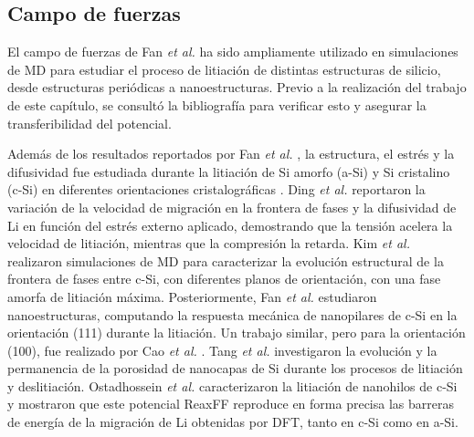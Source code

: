 \subsection{Campo de fuerzas}

El campo de fuerzas de Fan \textit{et al.} ha sido ampliamente utilizado en 
simulaciones de MD para estudiar el proceso de litiación de distintas estructuras
de silicio, desde estructuras periódicas a nanoestructuras. Previo a la 
realización del trabajo de este capítulo, se consultó la bibliografía para 
verificar esto y asegurar la transferibilidad del potencial. 

Además de los resultados reportados por Fan \textit{et al.} \cite{fan2013}, 
la estructura, el estrés y la difusividad fue estudiada durante la litiación de 
Si amorfo (a-Si) y Si cristalino (c-Si) en diferentes orientaciones 
cristalográficas \cite{chen2020, kim2015}. Ding \textit{et al.} \cite{ding2017} 
reportaron la variación de la velocidad de migración en la frontera de fases y la 
difusividad de Li en función del estrés externo aplicado, demostrando que la 
tensión acelera la velocidad de litiación, mientras que la compresión la retarda. 
Kim \textit{et al.} \cite{kim2014} realizaron simulaciones de MD para caracterizar 
la evolución estructural de la frontera de fases entre c-Si, con diferentes planos 
de orientación, con una fase amorfa de litiación máxima. Posteriormente, Fan 
\textit{et al.} \cite{fan2018} estudiaron nanoestructuras, computando la respuesta
mecánica de nanopilares de c-Si en la orientación (111) durante la litiación.
Un trabajo similar, pero para la orientación (100), fue realizado por Cao 
\textit{et al.} \cite{cao2019}. Tang \textit{et al.} \cite{tang2019} investigaron
la evolución y la permanencia de la porosidad de nanocapas de Si durante los 
procesos de litiación y deslitiación. Ostadhossein \textit{et al.} 
\cite{ostadhossein2015} caracterizaron la litiación de nanohilos de c-Si y mostraron
que este potencial ReaxFF reproduce en forma precisa las barreras de energía de 
la migración de Li obtenidas por DFT, tanto en c-Si como en a-Si.

